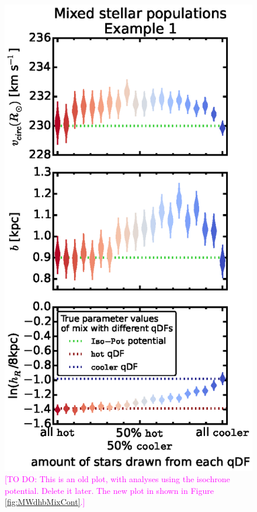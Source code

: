 \documentclass[iop,revtex4]{emulateapj}
\newcommand{\Wilma}[1]{\textcolor{Magenta}{#1}}
\begin{document}
\begin{appendix}
\begin{figure}[!htbp]
\centering
\begin{minipage}{0.48\textwidth}
\centering
\includegraphics[scale=0.55]{figs/isoSphFlexMixCont_violins_2.eps}
\caption{\Wilma{[TO DO: This is an old plot, with analyses using the isochrone potential. Delete it later. The new plot in shown in Figure \ref{fig:MWdhbMixCont}.]}}

\end{minipage}
\end{figure}
\end{appendix}
\end{document}

